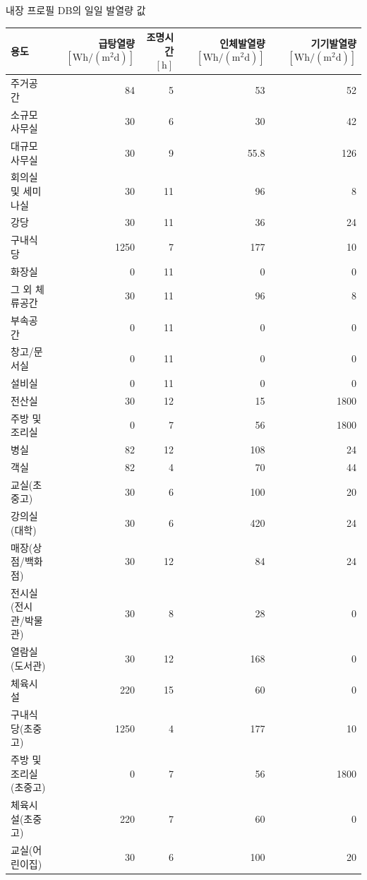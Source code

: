 \begin{defaulttable}
  \caption{내장 프로필 DB의 일일 발열량 값}
  \label{tab:profile-db-load}
  {\small
  \renewcommand{\arraystretch}{1.08}
  \begin{tabularx}{\textwidth}{Xrrrr}
    \toprule
    용도 & \makecell[r]{급탕열량 \\ $[\mathrm{Wh/(m^2d)}]$} & \makecell[r]{조명시간\\$[\mathrm{h}]$} & \makecell[r]{인체발열량\\ $[\mathrm{Wh/(m^2d)}]$} & \makecell[r]{기기발열량\\ $[\mathrm{Wh/(m^2d)}]$} \\ 
    \midrule

    주거공간                & 84   & 5  & 53   & 52   \\
    소규모사무실            & 30   & 6  & 30   & 42   \\
    대규모사무실            & 30   & 9  & 55.8 & 126  \\
    회의실 및 세미나실      & 30   & 11 & 96   & 8    \\
    강당                    & 30   & 11 & 36   & 24   \\
    구내식당                & 1250 & 7  & 177  & 10   \\
    화장실                  & 0    & 11 & 0    & 0    \\
    그 외 체류공간          & 30   & 11 & 96   & 8    \\
    부속공간                & 0    & 11 & 0    & 0    \\
    창고/문서실           & 0    & 11 & 0    & 0    \\
    설비실              & 0    & 11 & 0    & 0    \\
    전산실                  & 30   & 12 & 15   & 1800 \\
    주방 및 조리실          & 0    & 7  & 56   & 1800 \\
    병실                    & 82   & 12 & 108  & 24   \\
    객실                    & 82   & 4  & 70   & 44   \\
    교실(초중고)            & 30   & 6  & 100  & 20   \\
    강의실(대학)            & 30   & 6  & 420  & 24   \\
    매장(상점/백화점)       & 30   & 12 & 84   & 24   \\
    전시실(전시관/박물관)   & 30   & 8  & 28   & 0    \\
    열람실(도서관)          & 30   & 12 & 168  & 0    \\
    체육시설                & 220  & 15 & 60   & 0    \\
    구내식당(초중고)        & 1250 & 4  & 177  & 10   \\
    주방 및 조리실(초중고)  & 0    & 7  & 56   & 1800 \\
    체육시설(초중고)        & 220  & 7  & 60   & 0    \\
    교실(어린이집)          & 30   & 6  & 100  & 20   \\

    \bottomrule
  \end{tabularx}
  }
\end{defaulttable}

